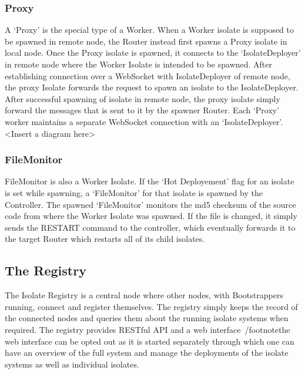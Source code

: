   \subsubsection{Proxy}
  A ‘Proxy’ is the special type of a Worker. When a Worker isolate is supposed to be spawned in remote node, the Router instead first spawns a Proxy isolate in local node. Once the Proxy isolate is spawned, it connects to the ‘IsolateDeployer’ in remote node where the Worker Isolate is intended to be spawned. After establishing connection over a WebSocket with IsolateDeployer of remote node, the proxy Isolate forwards the request to spawn an isolate to the IsolateDeployer. After successful spawning of isolate in remote node, the proxy isolate simply forward the messages that is sent to it by the spawner Router. Each ‘Proxy’ worker maintains a separate WebSocket connection with an ‘IsolateDeployer’.
  <Insert a diagram here>

  \subsubsection{FileMonitor}
  FileMonitor is also a Worker Isolate. If the ‘Hot Deployement’ flag for an isolate is set while spawning, a ‘FileMonitor’ for that isolate is spawned by the Controller. The spawned ‘FileMonitor’ monitors the md5 checksum of the source code from where the Worker Isolate was spawned. If the file is changed, it simply sends the RESTART command to the controller, which eventually forwards it to the target Router which restarts all of its child isolates.

\subsection{The Registry}
The Isolate Registry is a central node where other nodes, with Bootstrappers running, connect and register themselves. The registry simply keeps the record of the connected nodes and queries them about the running isolate systems when required. The registry provides RESTful API and a web interface~/footnote{the web interface can be opted out as it is started separately} through which one can have an overview of the full system and manage the deployments of the isolate systems as well as individual isolates.

